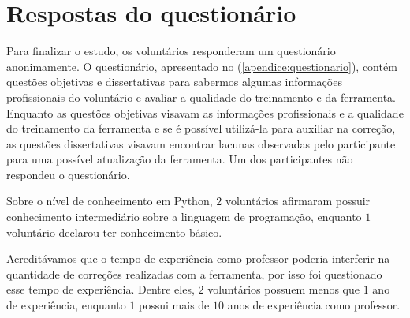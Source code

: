 %		
%		
		
	\section{Respostas do questionário}
		Para finalizar o estudo, os voluntários responderam um questionário
		anonimamente. O questionário, apresentado no (\cref{apendice:questionario}),
		contém questões objetivas e	dissertativas para sabermos algumas informações
		profissionais do voluntário e avaliar a qualidade do treinamento e da
		ferramenta. Enquanto as questões objetivas visavam as informações profissionais
		e a qualidade do treinamento da ferramenta e se é possível utilizá-la para
		auxiliar na correção, as questões dissertativas visavam encontrar lacunas
		observadas pelo participante para uma possível atualização da ferramenta.
		Um dos participantes não respondeu o questionário.
		
		Sobre o nível de conhecimento em Python, $2$ voluntários afirmaram possuir
		conhecimento intermediário sobre a linguagem de programação, enquanto $1$
		voluntário declarou ter conhecimento básico.		
		
		Acreditávamos que o tempo de experiência como professor poderia interferir
		na quantidade de correções realizadas com a ferramenta, por isso foi questionado
		esse tempo de experiência. Dentre eles, $2$ voluntários possuem menos que $1$
		ano de experiência, enquanto $1$ possui mais de $10$ anos de experiência como
		professor.
		

